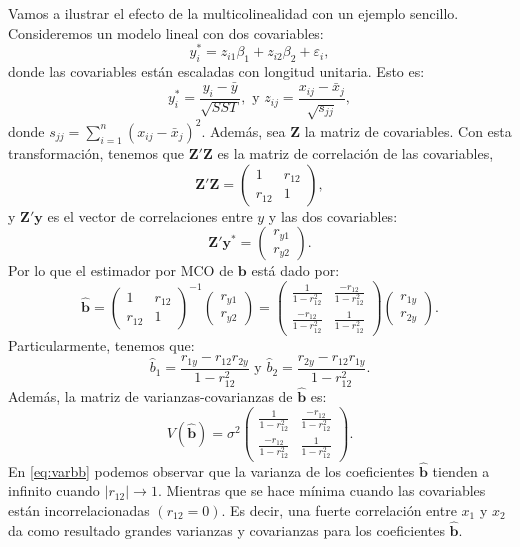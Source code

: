\documentclass[
]{article}
\begin{document}
Vamos a ilustrar el efecto de la multicolinealidad con un ejemplo sencillo. Consideremos un modelo lineal con dos covariables:
\[
y_{i}^{*} = z_{i1}\beta_1 +z_{i2}\beta_2 +\varepsilon_i, 
\]
donde las covariables están escaladas con longitud unitaria. Esto es:
\[
y_{i}^{*} = \frac{y_{i}-\bar{y}}{\sqrt{SST}}, \mbox{ y } z_{ij} = \frac{x_{ij} - \bar{x}_{j}}{\sqrt{s_{jj}}},
\]
donde \(s_{jj} = \sum_{i=1}^{n}(x_{ij}-\bar{x}_{j})^{2}\). Además, sea \(\boldsymbol Z\) la matriz de covariables. Con esta transformación, tenemos que \(\boldsymbol Z'\boldsymbol Z\) es la matriz de correlación de las covariables,
\[
\boldsymbol Z'\boldsymbol Z= \begin{pmatrix}
1 & r_{12} \\ r_{12} & 1
\end{pmatrix},
\]
y \(\boldsymbol Z'\boldsymbol y\) es el vector de correlaciones entre \(y\) y las dos covariables:
\[
\boldsymbol Z'\boldsymbol y^{*} = \begin{pmatrix}
r_{y1} \\ r_{y2}
\end{pmatrix}.
\]
Por lo que el estimador por MCO de \(\boldsymbol b\) está dado por:
\[
\widehat{\boldsymbol b}= \begin{pmatrix}
1 & r_{12} \\ r_{12} & 1
\end{pmatrix}^{-1}\begin{pmatrix}
r_{y1} \\ r_{y2}
\end{pmatrix} = \begin{pmatrix}
\frac{1}{1-r_{12}^{2}} & \frac{-r_{12}}{1-r_{12}^{2}} \\ \frac{-r_{12}}{1-r_{12}^{2}} & \frac{1}{1-r_{12}^{2}} \end{pmatrix} \begin{pmatrix}
r_{1y} \\ r_{2y}
\end{pmatrix}.
\]
Particularmente, tenemos que:
\[
\widehat{b}_{1} = \frac{r_{1y}-r_{12}r_{2y}}{1-r_{12}^{2}} \mbox{ y } \widehat{b}_{2} = \frac{r_{2y}-r_{12}r_{1y}}{1-r_{12}^{2}}.
\]
Además, la matriz de varianzas-covarianzas de \(\widehat{\boldsymbol b}\) es:
\begin{equation}
V(\widehat{\boldsymbol b}) = \sigma^{2} \begin{pmatrix}
\frac{1}{1-r_{12}^{2}} & \frac{-r_{12}}{1-r_{12}^{2}} \\ \frac{-r_{12}}{1-r_{12}^{2}} & \frac{1}{1-r_{12}^{2}} \end{pmatrix}.
\label{eq:varbb}
\end{equation}
En \eqref{eq:varbb} podemos observar que la varianza de los coeficientes \(\widehat{\boldsymbol b}\) tienden a infinito cuando \(|r_{12}|\rightarrow 1\). Mientras que se hace mínima cuando las covariables están incorrelacionadas \((r_{12}=0)\). Es decir, una fuerte correlación entre \(x_1\) y \(x_2\) da como resultado grandes varianzas y covarianzas para los coeficientes \(\widehat{\boldsymbol b}\).
\end{document}
